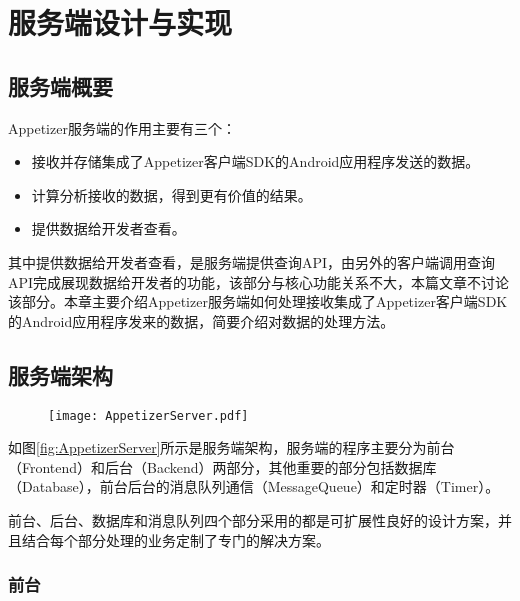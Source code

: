 
\chapter{服务端设计与实现}
\label{chap:server}

\section{服务端概要}
\label{sec:serverOverview}

Appetizer服务端的作用主要有三个：

\begin{itemize}
	\item 接收并存储集成了Appetizer客户端SDK的Android应用程序发送的数据。
	\item 计算分析接收的数据，得到更有价值的结果。
	\item 提供数据给开发者查看。
\end{itemize}

其中提供数据给开发者查看，是服务端提供查询API，由另外的客户端调用查询API完成展现数据给开发者的功能，该部分与核心功能关系不大，本篇文章不讨论该部分。本章主要介绍Appetizer服务端如何处理接收集成了Appetizer客户端SDK的Android应用程序发来的数据，简要介绍对数据的处理方法。

\section{服务端架构}
\label{sec:serverArch}

\begin{figure}[!htp]
	\centering
	\texttt{[image: AppetizerServer.pdf]}
\end{figure}


如图\ref{fig:AppetizerServer}所示是服务端架构，服务端的程序主要分为前台（Frontend）和后台（Backend）两部分，其他重要的部分包括数据库（Database），前台后台的消息队列通信（MessageQueue）和定时器（Timer）。

前台、后台、数据库和消息队列四个部分采用的都是可扩展性良好的设计方案，并且结合每个部分处理的业务定制了专门的解决方案。

\subsection{前台}
\label{subsec:serverFrontend}

